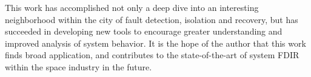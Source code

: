 This work has accomplished not only a deep dive into an interesting neighborhood within the city of fault detection, isolation and recovery, but has succeeded in developing new tools to encourage greater understanding and improved analysis of system behavior. It is the hope of the author that this work finds broad application, and contributes to the state-of-the-art of system FDIR within the space industry in the future.